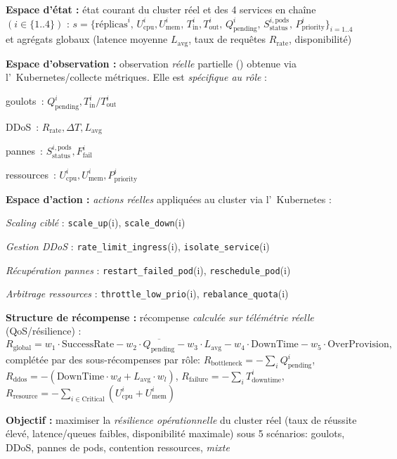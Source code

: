 \begin{enumerate*}[label={\roman*)}, itemjoin={;\quad}]
  \item \textbf{Espace d'état :} état courant du cluster réel et des 4 services en chaîne \((i \in \{1..4\})\) :
  \(
  s = \{\text{réplicas}^i,\,
  U_{\text{cpu}}^i, U_{\text{mem}}^i,\,
  T_{\text{in}}^i, T_{\text{out}}^i,\,
  Q_{\text{pending}}^i,\,
  S_{\text{status}}^{i,\text{pods}},\,
  P_{\text{priority}}^i\}_{i=1..4}
  \)
  et agrégats globaux (latence moyenne \(L_{\text{avg}}\), taux de requêtes \(R_{\text{rate}}\), disponibilité)
  \item \textbf{Espace d'observation :} observation \emph{réelle} partielle () obtenue via l’~Kubernetes/collecte métriques. Elle est \emph{spécifique au rôle} :
  \begin{enumerate*}[label={}, itemjoin={;\,}]
    \item goulots~: \(Q_{\text{pending}}^i, T_{\text{in}}^i/T_{\text{out}}^i\)
    \item DDoS~: \(R_{\text{rate}}, \Delta T, L_{\text{avg}}\)
    \item pannes~: \(S_{\text{status}}^{i,\text{pods}}, F_{\text{fail}}^i\)
    \item ressources~: \(U_{\text{cpu}}^i, U_{\text{mem}}^i, P_{\text{priority}}^i\)
  \end{enumerate*}
  \item \textbf{Espace d'action :} \emph{actions réelles} appliquées au cluster via l’~Kubernetes :
  \begin{enumerate*}[label={\roman*)}, itemjoin={;\quad}]
    \item \emph{Scaling ciblé} : \texttt{scale\_up}(i), \texttt{scale\_down}(i)
    \item \emph{Gestion DDoS} : \texttt{rate\_limit\_ingress}(i), \texttt{isolate\_service}(i)
    \item \emph{Récupération pannes} : \texttt{restart\_failed\_pod}(i), \texttt{reschedule\_pod}(i)
    \item \emph{Arbitrage ressources} : \texttt{throttle\_low\_prio}(i), \texttt{rebalance\_quota}(i)
  \end{enumerate*}
  \item \textbf{Structure de récompense :} récompense \emph{calculée sur télémétrie réelle} (QoS/résilience) :
  \[
    R_{\text{global}}=
    w_1\cdot\text{SuccessRate}
    -w_2\cdot\overline{Q_{\text{pending}}}
    -w_3\cdot L_{\text{avg}}
    -w_4\cdot \text{DownTime}
    -w_5\cdot \text{OverProvision},
  \]
  complétée par des sous-récompenses par rôle:
  \(R_{\text{bottleneck}}=-\sum_i Q_{\text{pending}}^i\),
  \(R_{\text{ddos}}=-(\text{DownTime}\cdot w_d+L_{\text{avg}}\cdot w_l)\),
  \(R_{\text{failure}}=-\sum_i T_{\text{downtime}}^i\),
  \(R_{\text{resource}}=-\sum_{i\in\text{Critical}}(U_{\text{cpu}}^i+U_{\text{mem}}^i)\)
  \item \textbf{Objectif :} maximiser la \emph{résilience opérationnelle} du cluster réel (taux de réussite élevé, latence/queues faibles, disponibilité maximale) sous 5 scénarios: goulots, DDoS, pannes de pods, contention ressources, \emph{mixte}
\end{enumerate*}


